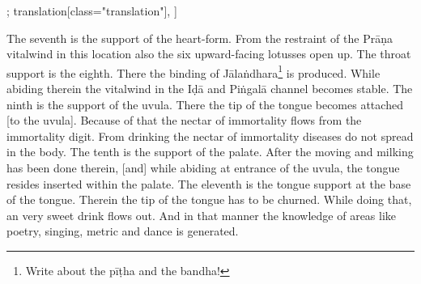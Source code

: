 \begin{alignment}[
  texts=edition[class="edition"];
  translation[class="translation"],
  ]
\begin{edition}
  \end{edition}
  \begin{translation}
    \begin{tlate}
      \noindent
The seventh is the support of the heart-form. From the restraint of the Prāṇa vitalwind in this location also the six upward-facing lotusses open up. The throat support is the eighth. There the binding of Jālaṅdhara\footnote{Write about the pīṭha and the bandha!} is produced.\textsuperscript{\coro{[\lowroman{25}]}} While abiding therein the vitalwind in the Iḍā and Piṅgalā channel becomes stable. The ninth is the support of the uvula. There the tip of the tongue becomes attached [to the uvula]. Because of that the nectar of immortality flows from the immortality digit. From drinking the nectar of immortality diseases do not spread in the body.\textsuperscript{\coro{[\lowroman{30}]}}
The tenth is the support of the palate. After the moving and milking has been done therein, [and] while abiding at entrance of the uvula, the tongue resides inserted within the palate. The eleventh is the tongue support at the base of the tongue. Therein the tip of the tongue has to be churned. While doing that, an very sweet drink flows out. And in that manner the knowledge of areas like poetry, singing, metric and dance is generated.\textsuperscript{\coro{[\lowroman{35}]}}
    \end{tlate}
  \end{translation}
\end{alignment}
